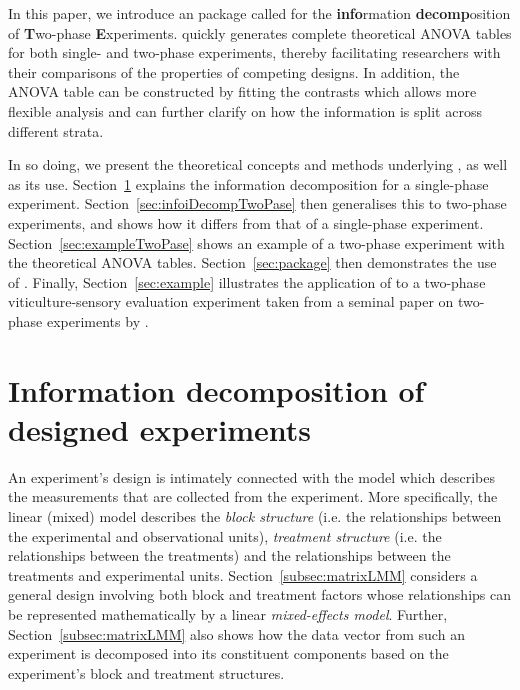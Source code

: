 \documentclass[article]{jss}
\begin{document}
In this paper, we introduce an  package called  for the {\bf info}rmation {\bf decomp}osition of {\bf T}wo-phase {\bf E}xperiments.  quickly generates complete theoretical ANOVA tables for both single- and two-phase experiments, thereby facilitating researchers  with their comparisons of the properties of competing designs. In addition, the ANOVA table can be constructed by fitting the contrasts which allows more flexible analysis and can further clarify on how the information is split across different strata.

In so doing, we present the theoretical concepts and methods underlying , as well as its use. Section~\ref{sec:infoDecomp} explains the information decomposition for a single-phase experiment. Section~\ref{sec:infoiDecompTwoPase} then generalises this to two-phase experiments, and shows how it differs from that of a single-phase experiment. Section~\ref{sec:exampleTwoPase} shows an example of a two-phase experiment with the theoretical ANOVA tables. Section~\ref{sec:package} then demonstrates the use of . Finally, Section~\ref{sec:example} illustrates the application of  to a two-phase viticulture-sensory evaluation experiment taken from a seminal paper on two-phase experiments by \cite{Brien1999}.

\section{Information decomposition of designed experiments} 
\label{sec:infoDecomp}
An experiment's design is intimately connected with the model which describes the measurements that are collected from the experiment. More specifically, the linear (mixed) model describes the \emph{block structure} (i.e. the relationships between the experimental and observational units), \emph{treatment structure} (i.e. the relationships between the treatments) and the relationships between the treatments and experimental units. Section~\ref{subsec:matrixLMM} considers a general design involving both block and treatment factors whose relationships can be represented mathematically by a linear \emph{mixed-effects model}. Further, Section~\ref{subsec:matrixLMM} also shows how the data vector from such an experiment is decomposed into its constituent components based on the experiment's block and treatment structures.
\end{document}
